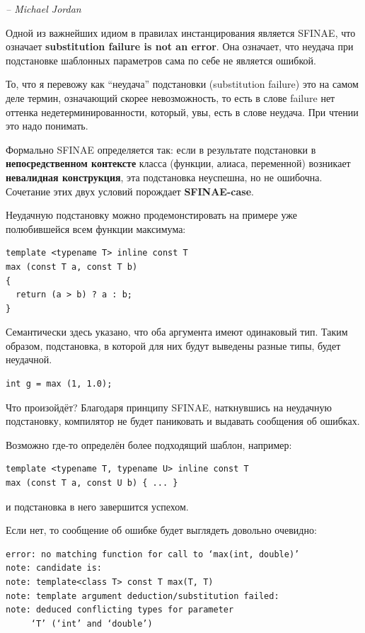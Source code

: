 \documentclass[a4paper,12pt,oneside]{article}
\begin{document}
\hfill\textit{-- Michael Jordan}

Одной из важнейших идиом в правилах инстанцирования является SFINAE, что означает \textbf{substitution failure is not an error}. Она означает, что неудача при подстановке шаблонных параметров сама по себе не является ошибкой.

То, что я перевожу как ``неудача'' подстановки (substitution failure) это на самом деле термин, означающий скорее невозможность, то есть в слове failure нет оттенка недетерминированности, который, увы, есть в слове неудача. При чтении это надо понимать. 

Формально SFINAE определяется так: если в результате подстановки в \textbf{непосредственном контексте} класса (функции, алиаса, переменной) возникает \textbf{невалидная конструкция}, эта подстановка неуспешна, но не ошибочна. Сочетание этих двух условий порождает \textbf{SFINAE-case}.

Неудачную подстановку можно продемонстировать на примере уже полюбившейся всем функции максимума:

\begin{lstlisting}
template <typename T> inline const T
max (const T a, const T b)
{
  return (a > b) ? a : b;
}
\end{lstlisting}

Семантически здесь указано, что оба аргумента имеют одинаковый тип. Таким образом, подстановка, в которой для них будут выведены разные типы, будет неудачной.

\begin{lstlisting}
int g = max (1, 1.0);
\end{lstlisting}

Что произойдёт? Благодаря принципу SFINAE, наткнувшись на неудачную подстановку, компилятор не будет паниковать и выдавать сообщения об ошибках. 

Возможно где-то определён более подходящий шаблон, например:

\begin{lstlisting}
template <typename T, typename U> inline const T 
max (const T a, const U b) { ... }
\end{lstlisting}

и подстановка в него завершится успехом.

Если нет, то сообщение об ошибке будет выглядеть довольно очевидно:

\begin{verbatim}
error: no matching function for call to ‘max(int, double)’
note: candidate is:
note: template<class T> const T max(T, T)
note: template argument deduction/substitution failed:
note: deduced conflicting types for parameter 
     ‘T’ (‘int’ and ‘double’)
\end{verbatim}
\end{document}
